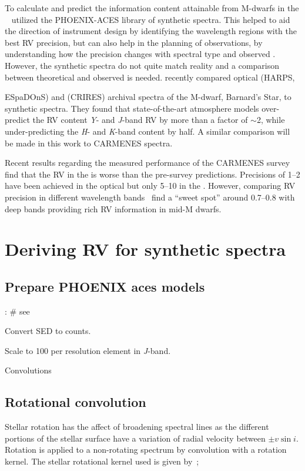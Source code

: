 To calculate and predict the information content attainable from {M-dwarfs} in the \nir{}~\cite{figueira_radial_2016} utilized the {PHOENIX-ACES} library of synthetic spectra.
This helped to aid the direction of instrument design by identifying the wavelength regions with the best {RV} precision, but can also help in the planning of observations, by understanding how the precision changes with spectral type and observed {\snr{}}.
However, the synthetic spectra do not quite match reality and a comparison between theoretical and observed is needed.
\citet{artigau_optical_2018} recently compared optical (HARPS, {ESpaDOnS) and \nir{} (CRIRES) archival spectra of the M-dwarf, Barnard's Star, to synthetic spectra.
They found that state-of-the-art atmosphere models over-predict the {RV} content \emph{Y}- and \emph{J}-band {RV} by more than a factor of \(\sim\)2, while under-predicting the \emph{H}- and \emph{K}-band content by half.
A similar comparison will be made in this work to {CARMENES} spectra.

Recent results regarding the measured performance of the CARMENES survey~\citep{reiners_carmenes_2018,quirrenbach_carmenes_2018} find that the {RV} in the \nir{} is worse than the pre-survey predictions.
Precisions of 1--2\mps{} have been achieved in the optical but only 5--10\mps{} in the \nir{}.
However, comparing RV precision in different wavelength bands~\citet{quirrenbach_carmenes_2018} find a ``sweet spot'' around 0.7--0.8\um{} with deep  bands providing rich {RV} information in mid-M dwarfs.





\section{Deriving RV for synthetic spectra}

\subsection{Prepare {PHOENIX} aces models}:
\# see~\citet{figueira_radial_2016}

Convert SED to counts.


Scale to 100 \snr{} per resolution element in \emph{J}-band.

Convolutions

\subsection{Rotational convolution}
\label{subsec:rotational_convolution}
Stellar rotation has the affect of broadening spectral lines as the different portions of the stellar surface have a variation of radial velocity between \(\pm v \sin i\).
Rotation is applied to a non-rotating spectrum by convolution with a rotation kernel.
The stellar rotational kernel used is given by~\citet{gray_observation_2005};

}
